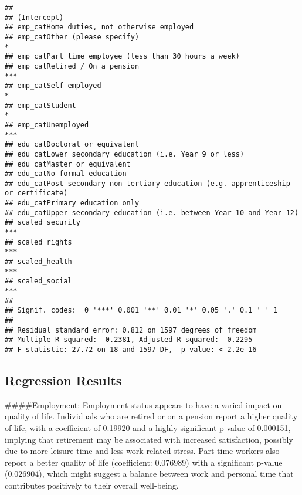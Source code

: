 \documentclass[
]{article}
\begin{document}
\begin{verbatim}
##                                                                                      
## (Intercept)                                                                          
## emp_catHome duties, not otherwise employed                                           
## emp_catOther (please specify)                                                     *  
## emp_catPart time employee (less than 30 hours a week)                                
## emp_catRetired / On a pension                                                     ***
## emp_catSelf-employed                                                              *  
## emp_catStudent                                                                    *  
## emp_catUnemployed                                                                 ***
## edu_catDoctoral or equivalent                                                        
## edu_catLower secondary education (i.e. Year 9 or less)                               
## edu_catMaster or equivalent                                                          
## edu_catNo formal education                                                           
## edu_catPost-secondary non-tertiary education (e.g. apprenticeship or certificate)    
## edu_catPrimary education only                                                        
## edu_catUpper secondary education (i.e. between Year 10 and Year 12)                  
## scaled_security                                                                   ***
## scaled_rights                                                                     ***
## scaled_health                                                                     ***
## scaled_social                                                                     ***
## ---
## Signif. codes:  0 '***' 0.001 '**' 0.01 '*' 0.05 '.' 0.1 ' ' 1
## 
## Residual standard error: 0.812 on 1597 degrees of freedom
## Multiple R-squared:  0.2381, Adjusted R-squared:  0.2295 
## F-statistic: 27.72 on 18 and 1597 DF,  p-value: < 2.2e-16
\end{verbatim}

\hypertarget{regression-results}{%
\subsection{Regression Results}\label{regression-results}}

\#\#\#\#Employment: Employment status appears to have a varied impact on
quality of life. Individuals who are retired or on a pension report a
higher quality of life, with a coefficient of 0.19920 and a highly
significant p-value of 0.000151, implying that retirement may be
associated with increased satisfaction, possibly due to more leisure
time and less work-related stress. Part-time workers also report a
better quality of life (coefficient: 0.076989) with a significant
p-value (0.026904), which might suggest a balance between work and
personal time that contributes positively to their overall well-being.
\end{document}
